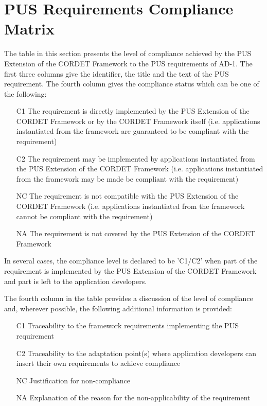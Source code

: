 \documentclass{pnp_article}
\begin{document}
\section{PUS Requirements Compliance Matrix}\label{sec:PusReqSOC}
The table in this section presents the level of compliance achieved by the PUS Extension of the CORDET Framework to the PUS requirements of AD-1. The first three columns give the identifier, the title and the text of the PUS requirement. The fourth column gives the compliance status which can be one of the following:

\begin{itemize}
\item [C1] The requirement is directly implemented by the PUS Extension of the CORDET Framework or by the CORDET Framework itself (i.e. applications instantiated from the framework are guaranteed to be compliant with the requirement)
\item [C2] The requirement may be implemented by applications instantiated from the PUS Extension of the CORDET Framework (i.e. applications instantiated from the framework may be made be compliant with the requirement)
\item [NC] The requirement is not compatible with the PUS Extension of the CORDET Framework (i.e. applications instantiated from the framework cannot be compliant with the requirement)
\item [NA] The requirement is not covered by the PUS Extension of the CORDET Framework
\end{itemize}

In several cases, the compliance level is declared to be 'C1/C2' when part of the requirement is implemented by the PUS Extension of the CORDET Framework and part is left to the application developers.

The fourth column in the table provides a discussion of the level of compliance and, wherever possible, the following additional information is provided:

\begin{itemize}
\item [C1] Traceability to the framework requirements implementing the PUS requirement 
\item [C2] Traceability to the adaptation point(s) where application developers can insert their own requirements to achieve compliance
\item [NC] Justification for non-compliance
\item [NA] Explanation of the reason for the non-applicability of the requirement
\end{itemize}
\end{document}
